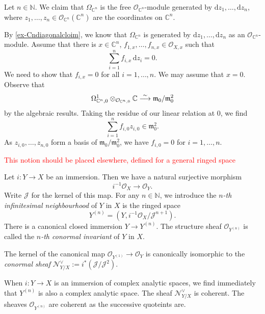 \begin{example}\label{ex-OmegaCn}
    Let $n\in \mathbb{N}$. We claim that $\Omega_{\mathbb{C}^n}$ is the free $\mathcal{O}_{\mathbb{C}^n}$-module generated by $\mathrm{d}z_1,\ldots,\mathrm{d}z_n$, where $z_1,\ldots,z_n\in \mathcal{O}_{\mathbb{C}^n}(\mathbb{C}^n)$ are the coordinates on $\mathbb{C}^n$.
    
    By \cref{ex-Cndiagonalcloim}, we know that $\Omega_{\mathbb{C}^n}$ is generated by $\mathrm{d}z_1,\ldots,\mathrm{d}z_n$ as an $\mathcal{O}_{\mathbb{C}^n}$-module. Assume that there is $x\in \mathbb{C}^n$, $f_{1,x},\ldots,f_{n,x}\in \mathcal{O}_{X,x}$ such that 
    \[
        \sum_{i=1}^n f_{i,x}\,\mathrm{d}z_i=0.
    \]
        We need to show that $f_{i,x}=0$ for all $i=1,\ldots,n$. We may assume that $x=0$. Observe that 
    \[
        \Omega^1_{\mathbb{C}^n,0}\otimes_{\mathcal{O}_{\mathbb{C}^n,0}} \mathbb{C}\stackrel{\sim}{\longrightarrow} \mathfrak{m}_{0}/\mathfrak{m}_{0}^2  
    \]
    by the algebraic results. Taking the residue of our linear relation at $0$, we find
    \[
        \sum_{i=1}^n f_{i,0} z_{i,0}\in \mathfrak{m}_0^2.  
    \]
    As $z_{i,0},\ldots,z_{n,0}$ form a basis of $\mathfrak{m}_0/\mathfrak{m}_0^2$, we have $f_{i,0}=0$ for $i=1,\ldots,n$.
\end{example}

\iffalse

\textcolor{red}{This notion should be placed elsewhere, defined for a general ringed space}
\begin{definition}
    Let $i:Y\rightarrow X$ be an immersion. Then we have a natural surjective morphism
    \[
        i^{-1}\mathcal{O}_X\rightarrow \mathcal{O}_Y.  
    \]
    Write $\mathcal{J}$ for the kernel of this map. For any $n\in \mathbb{N}$, we introduce the \emph{$n$-th infinitesimal neighbourhood} of $Y$ in $X$ is the ringed space 
    \[
        Y^{(n)}=(Y,i^{-1}\mathcal{O}_X/\mathcal{J}^{n+1}). 
    \] 
    There is a canonical closed immersion $Y\rightarrow Y^{(n)}$. The structure sheaf $\mathcal{O}_{Y^{(n)}}$ is called the \emph{$n$-th conormal invariant} of $Y$ in $X$.

    The kernel of the canonical map $\mathcal{O}_{Y^{(1)}}\rightarrow \mathcal{O}_Y$ is canonically isomorphic to the \emph{conormal sheaf} $\mathcal{N}^{\vee}_{Y/X}:=i^*(\mathcal{J}/\mathcal{J}^2)$.
\end{definition}
When $i:Y\rightarrow X$ is an immersion of complex analytic spaces, we find immediately that $Y^{(n)}$ is also a complex analytic space. The sheaf $\mathcal{N}^{\vee}_{Y/X}$ is coherent. The sheaves $\mathcal{O}_{Y^{(n)}}$ are coherent as the successive quoteints are.

